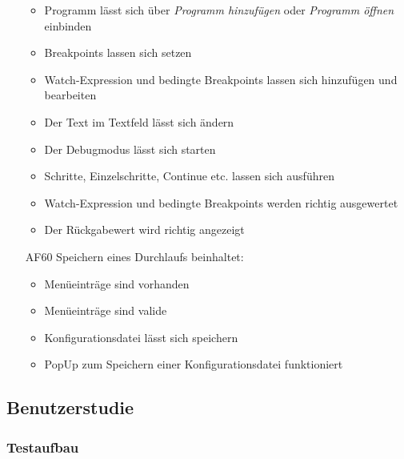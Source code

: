 \documentclass[parskip=full]{scrartcl}
\begin{document}
\begin{itemize}
	\begin{itemize}
		\item Programm lässt sich über \textit{Programm hinzufügen} oder \textit{Programm öffnen} einbinden
		\item Breakpoints lassen sich setzen
		\item Watch-Expression und bedingte Breakpoints lassen sich hinzufügen und bearbeiten
		\item Der Text im Textfeld lässt sich ändern
		\item Der Debugmodus lässt sich starten
		\item Schritte, Einzelschritte, Continue etc. lassen sich ausführen
		\item Watch-Expression und bedingte Breakpoints werden richtig ausgewertet
		\item Der Rückgabewert wird richtig angezeigt
	\end{itemize}
	\item[AF60] Speichern eines Durchlaufs beinhaltet:
	\begin{itemize}
		\item Menüeinträge sind vorhanden
		\item Menüeinträge sind valide
		\item Konfigurationsdatei lässt sich speichern
		\item PopUp zum Speichern einer Konfigurationsdatei funktioniert
	\end{itemize}
\end{itemize}

\subsection{Benutzerstudie}\label{usertestimdoc}

\subsubsection{Testaufbau}
\end{document}
